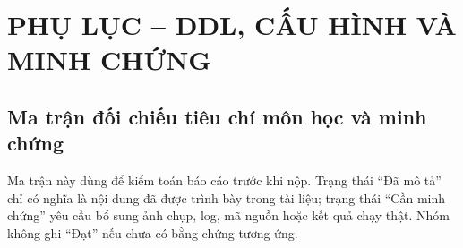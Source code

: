 \appendix
\chapter{PHỤ LỤC -- DDL, CẤU HÌNH VÀ MINH CHỨNG}

\section{Ma trận đối chiếu tiêu chí môn học và minh chứng}

Ma trận này dùng để kiểm toán báo cáo trước khi nộp. Trạng thái ``Đã mô tả'' chỉ có nghĩa là nội dung đã được trình bày trong tài liệu; trạng thái ``Cần minh chứng'' yêu cầu bổ sung ảnh chụp, log, mã nguồn hoặc kết quả chạy thật. Nhóm không ghi ``Đạt'' nếu chưa có bằng chứng tương ứng.

\begingroup
\scriptsize
\setlength{\LTleft}{0pt}
\setlength{\LTright}{0pt}

